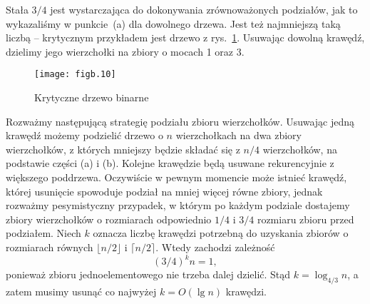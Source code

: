 \subproblem %
Stała $3/4$ jest wystarczająca do dokonywania zrównoważonych podziałów, jak to wykazaliśmy w punkcie~(a) dla dowolnego drzewa. Jest też najmniejszą taką liczbą -- krytycznym przykładem jest drzewo z rys.~\ref{fig:B-3b}. Usuwając dowolną krawędź, dzielimy jego wierzchołki na zbiory o mocach 1 oraz 3.
\begin{figure}[ht]
	\begin{center}
		\texttt{[image: figb.10]}
	\end{center}
	\caption{Krytyczne drzewo binarne} \label{fig:B-3b}
\end{figure}

\subproblem %
Rozważmy następującą strategię podziału zbioru wierzchołków. Usuwając jedną krawędź możemy podzielić drzewo o $n$ wierzchołkach na dwa zbiory wierzchołków, z których mniejszy będzie składać się z $n/4$ wierzchołków, na podstawie części (a) i (b). Kolejne krawędzie będą usuwane rekurencyjnie z większego poddrzewa. Oczywiście w pewnym momencie może istnieć krawędź, której usunięcie spowoduje podział na mniej więcej równe zbiory, jednak rozważmy pesymistyczny przypadek, w którym po każdym podziale dostajemy zbiory wierzchołków o rozmiarach odpowiednio $1/4$ i $3/4$ rozmiaru zbioru przed podziałem. Niech $k$ oznacza liczbę krawędzi potrzebną do uzyskania zbiorów o rozmiarach równych $\lfloor n/2\rfloor$ i $\lceil n/2\rceil$. Wtedy zachodzi zależność
\[
    (3/4)^kn = 1,
\]
ponieważ zbioru jednoelementowego nie trzeba dalej dzielić. Stąd $k=\log_{4/3}n$, a zatem musimy usunąć co najwyżej $k=O(\lg n)$ krawędzi.

\endinput
